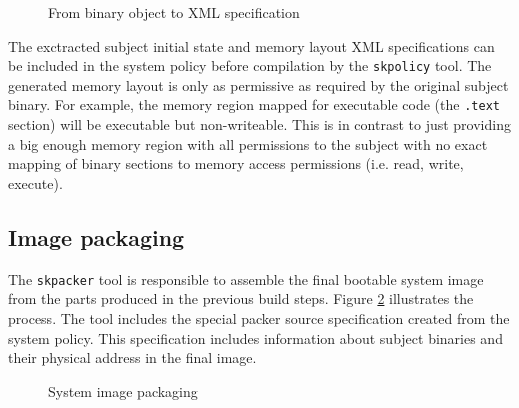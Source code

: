 \begin{figure}[h]
	\centering
	\caption{From binary object to XML specification}
	\label{fig:object-analysis}
\end{figure}

The exctracted subject initial state and memory layout XML specifications can be
included in the system policy before compilation by the \texttt{skpolicy} tool.
The generated memory layout is only as permissive as required by the original
subject binary. For example, the memory region mapped for executable code
(the \texttt{.text} section) will be executable but non-writeable. This is in
contrast to just providing a big enough memory region with all permissions to
the subject with no exact mapping of binary sections to memory access
permissions (i.e. read, write, execute).

\subsection{Image packaging}\label{subsec:image-packaging}
The \texttt{skpacker} tool is responsible to assemble the final bootable system
image from the parts produced in the previous build steps. Figure
\ref{fig:image-packaging} illustrates the process. The tool includes the special
packer source specification created from the system policy. This specification
includes information about subject binaries and their physical address in the
final image.

\begin{figure}[h]
	\centering
	\caption{System image packaging}
	\label{fig:image-packaging}
\end{figure}

